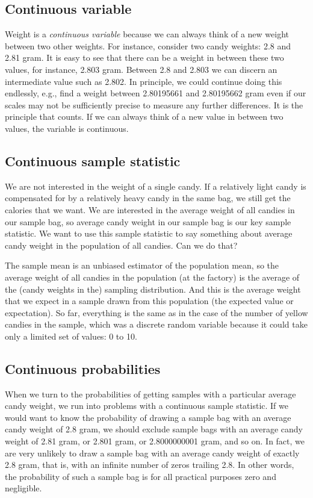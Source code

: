 \documentclass[a4paper]{book}
\theoremstyle{definition}
\theoremstyle{definition}
\theoremstyle{definition}
\theoremstyle{remark}
\begin{document}
\subsection{Continuous variable}\label{continuous-variable}

Weight is a \emph{continuous variable} because we can always think of a
new weight between two other weights. For instance, consider two candy
weights: 2.8 and 2.81 gram. It is easy to see that there can be a weight
in between these two values, for instance, 2.803 gram. Between 2.8 and
2.803 we can discern an intermediate value such as 2.802. In principle,
we could continue doing this endlessly, e.g., find a weight between
2.80195661 and 2.80195662 gram even if our scales may not be
sufficiently precise to measure any further differences. It is the
principle that counts. If we can always think of a new value in between
two values, the variable is continuous.

\subsection{Continuous sample statistic}\label{cont_sample_stat}

We are not interested in the weight of a single candy. If a relatively
light candy is compensated for by a relatively heavy candy in the same
bag, we still get the calories that we want. We are interested in the
average weight of all candies in our sample bag, so average candy weight
in our sample bag is our key sample statistic. We want to use this
sample statistic to say something about average candy weight in the
population of all candies. Can we do that?

The sample mean is an unbiased estimator of the population mean, so the
average weight of all candies in the population (at the factory) is the
average of the (candy weights in the) sampling distribution. And this is
the average weight that we expect in a sample drawn from this population
(the expected value or expectation). So far, everything is the same as
in the case of the number of yellow candies in the sample, which was a
discrete random variable because it could take only a limited set of
values: 0 to 10.

\subsection{Continuous probabilities}\label{continuous-probabilities}

When we turn to the probabilities of getting samples with a particular
average candy weight, we run into problems with a continuous sample
statistic. If we would want to know the probability of drawing a sample
bag with an average candy weight of 2.8 gram, we should exclude sample
bags with an average candy weight of 2.81 gram, or 2.801 gram, or
2.8000000001 gram, and so on. In fact, we are very unlikely to draw a
sample bag with an average candy weight of exactly 2.8 gram, that is,
with an infinite number of zeros trailing 2.8. In other words, the
probability of such a sample bag is for all practical purposes zero and
negligible.
\end{document}

